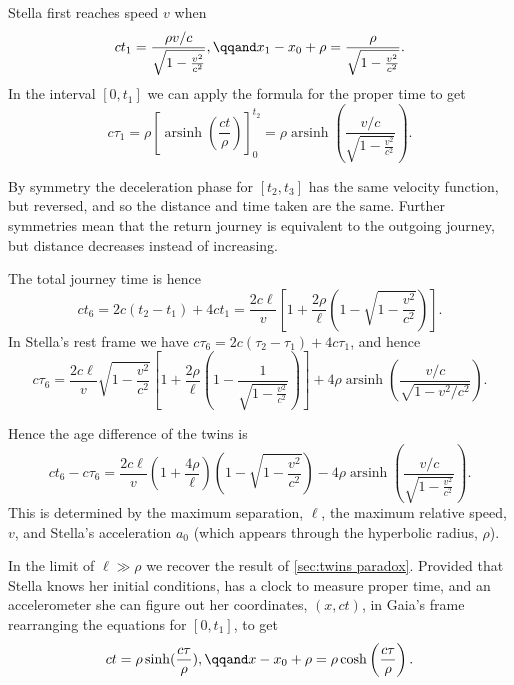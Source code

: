 \documentclass[fleqn]{NotesClass}
\DeclareMathOperator{\arsinh}{arsinh}
\begin{document}
    Stella first reaches speed \(v\) when
    \begin{equation}
        ct_1 = \frac{\rho v/c}{\sqrt{1 - \frac{v^2}{c^2}}}, \qqand x_1 - x_0 + \rho = \frac{\rho}{\sqrt{1 - \frac{v^2}{c^2}}}.
    \end{equation}
    In the interval \([0, t_1]\) we can apply the formula for the proper time to get
    \begin{equation}
        c\tau_1 = \rho\left[ \arsinh\left( \frac{ct}{\rho} \right) \right]_0^{t_2} = \rho\arsinh\left( \frac{v/c}{\sqrt{1 - \frac{v^2}{c^2}}} \right).
    \end{equation}

    By symmetry the deceleration phase for \([t_2, t_3]\) has the same velocity function, but reversed, and so the distance and time taken are the same.
    Further symmetries mean that the return journey is equivalent to the outgoing journey, but distance decreases instead of increasing.
    
    The total journey time is hence
    \begin{equation}
        ct_6 = 2c(t_2 - t_1) + 4ct_1 = \frac{2c\ell}{v}\left[ 1 + \frac{2\rho}{\ell} \left( 1 - \sqrt{1 - \frac{v^2}{c^2}} \right) \right].
    \end{equation}
    In Stella's rest frame we have \(c\tau_6 = 2c(\tau_2 - \tau_1) + 4c\tau_1\), and hence
    \begin{equation}
        c\tau_6 = \frac{2c\ell}{v}\sqrt{1 - \frac{v^2}{c^2}} \left[ 1 + \frac{2\rho}{\ell} \left( 1 - \frac{1}{\sqrt{1 - \frac{v^2}{c^2}}} \right) \right] + 4\rho \arsinh\left( \frac{v/c}{\sqrt{1 - v^2/c^2}} \right).
    \end{equation}
    
    Hence the age difference of the twins is
    \begin{equation}
        ct_6 - c\tau_6 = \frac{2c\ell}{v}\left( 1 + \frac{4\rho}{\ell} \right)\left( 1 - \sqrt{1 - \frac{v^2}{c^2}} \right) - 4\rho\arsinh\left( \frac{v/c}{\sqrt{1 - \frac{v^2}{c^2}}} \right).
    \end{equation}
    This is determined by the maximum separation, \(\ell\), the maximum relative speed, \(v\), and Stella's acceleration \(a_0\) (which appears through the hyperbolic radius, \(\rho\)).
    
    In the limit of \(\ell \gg \rho\) we recover the result of \cref{sec:twins paradox}.
    Provided that Stella knows her initial conditions, has a clock to measure proper time, and an accelerometer she can figure out her coordinates, \((x, ct)\), in Gaia's frame rearranging the equations for \([0, t_1]\), to get
    \begin{equation}
        ct = \rho\sinh(\frac{c\tau}{\rho}), \qqand x - x_0 + \rho = \rho\cosh\left( \frac{c\tau}{\rho} \right).
    \end{equation}
    
\end{document}
